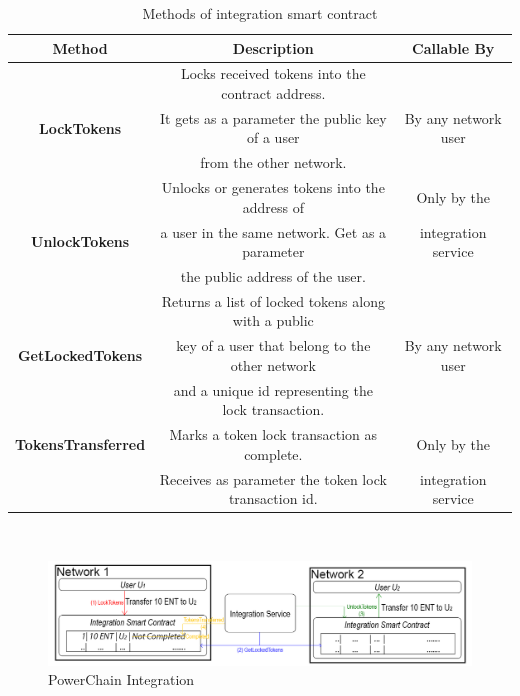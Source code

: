 \begin{table}[h!]
\begin{tabular}{c|c|c}
    \textbf{Method}            & \textbf{Description}                                 & \textbf{Callable By} \\
    \hline
                               & Locks received tokens into the contract address.     &                      \\
    \textbf{LockTokens}        & It gets as a parameter the public key of a user      & By any network user  \\
                               & from the other network.                              &                      \\
    \hline
                               & Unlocks or generates tokens into the address of      & Only by the          \\
    \textbf{UnlockTokens}      & a user in the same network. Get as a parameter       & integration service  \\
                               & the public address of the user.                      &                      \\
    \hline
                               & Returns a list of locked tokens along with a public  &                      \\
    \textbf{GetLockedTokens}   & key of a user that belong to the other network       & By any network user  \\
                               & and a unique id representing the lock transaction.   &                      \\
    \hline
    \textbf{TokensTransferred} & Marks a token lock transaction as complete.          & Only by the          \\
                               & Receives as parameter the token lock transaction id. & integration service  \\
\end{tabular}\\
\caption{Methods of integration smart contract}
\end{table}
\begin{figure}[h!]
    \centering
    \includegraphics[scale=0.4]{Figures/PowerChain_Integration.png}
    \caption{PowerChain Integration}
\end{figure}
